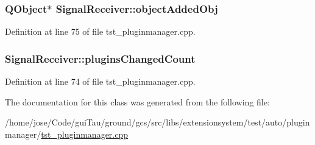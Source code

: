 \hypertarget{class_signal_receiver_a198c9501873f7f4b90f636190fdc266a}{
\subsubsection[{object\-Added\-Obj}]{\setlength{\rightskip}{0pt plus 5cm}Q\-Object$\ast$ Signal\-Receiver\-::object\-Added\-Obj}}\label{class_signal_receiver_a198c9501873f7f4b90f636190fdc266a}


Definition at line 75 of file tst\-\_\-pluginmanager.\-cpp.

\hypertarget{class_signal_receiver_a38ab4851af216c217c3469c177a85ce3}{
\subsubsection[{plugins\-Changed\-Count}]{ Signal\-Receiver\-::plugins\-Changed\-Count}}\label{class_signal_receiver_a38ab4851af216c217c3469c177a85ce3}


Definition at line 74 of file tst\-\_\-pluginmanager.\-cpp.



The documentation for this class was generated from the following file\-:\begin{DoxyCompactItemize}
\item 
/home/jose/\-Code/gui\-Tau/ground/gcs/src/libs/extensionsystem/test/auto/pluginmanager/\hyperlink{tst__pluginmanager_8cpp}{tst\-\_\-pluginmanager.\-cpp}\end{DoxyCompactItemize}
